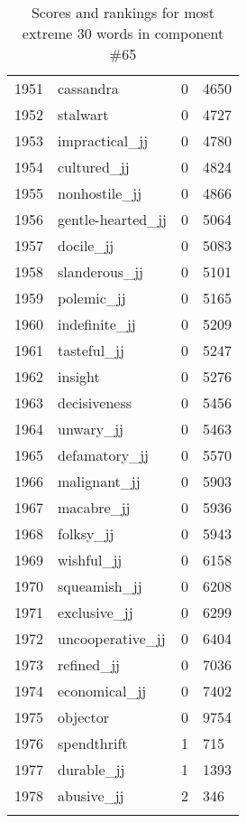 \begin{longtable}[!htbp]{| rlr@{.}l |}
    1951 & cassandra & 0 & 4650 \\
    1952 & stalwart & 0 & 4727 \\
    1953 & impractical\_jj & 0 & 4780 \\
    1954 & cultured\_jj & 0 & 4824 \\
    1955 & nonhostile\_jj & 0 & 4866 \\
    1956 & gentle-hearted\_jj & 0 & 5064 \\
    1957 & docile\_jj & 0 & 5083 \\
    1958 & slanderous\_jj & 0 & 5101 \\
    1959 & polemic\_jj & 0 & 5165 \\
    1960 & indefinite\_jj & 0 & 5209 \\
    1961 & tasteful\_jj & 0 & 5247 \\
    1962 & insight & 0 & 5276 \\
    1963 & decisiveness & 0 & 5456 \\
    1964 & unwary\_jj & 0 & 5463 \\
    1965 & defamatory\_jj & 0 & 5570 \\
    1966 & malignant\_jj & 0 & 5903 \\
    1967 & macabre\_jj & 0 & 5936 \\
    1968 & folksy\_jj & 0 & 5943 \\
    1969 & wishful\_jj & 0 & 6158 \\
    1970 & squeamish\_jj & 0 & 6208 \\
    1971 & exclusive\_jj & 0 & 6299 \\
    1972 & uncooperative\_jj & 0 & 6404 \\
    1973 & refined\_jj & 0 & 7036 \\
    1974 & economical\_jj & 0 & 7402 \\
    1975 & objector & 0 & 9754 \\
    1976 & spendthrift & 1 & 715 \\
    1977 & durable\_jj & 1 & 1393 \\
    1978 & abusive\_jj & 2 & 346 \\
    \hline
    \caption{Scores and rankings for most extreme 30 words in component \#65} \\
\end{longtable}

